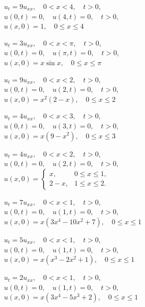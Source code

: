 \begin{exerciselist}
  \item\label{exer:12.1.9} $u_{t}=9u_{xx},\quad0<x<4,\quad t>0$,\\ $u(0,t)=0,\quad u(4,t)=0,\quad t>0$,\\ $u(x,0)=1,\quad0\le x\le4$

  \item\label{exer:12.1.10} $u_{t}=3u_{xx},\quad0<x<\pi,\quad t>0$,\\ $u(0,t)=0,\quad u(\pi,t)=0,\quad t>0$,\\ $u(x,0)=x\sin x,\quad0\le x\le\pi$

  \item\label{exer:12.1.11} \Cex $u_{t}=9u_{xx},\quad0<x<2,\quad t>0$,\\ $u(0,t)=0,\quad u(2,t)=0,\quad t>0$,\\ $u(x,0)=x^{2}(2-x),\quad0\le x\le2$

  \item\label{exer:12.1.12} $u_{t}=4u_{xx},\quad0<x<3,\quad t>0$,\\ $u(0,t)=0,\quad u(3,t)=0,\quad t>0$,\\ $u(x,0)=x(9-x^{2}),\quad0\le x\le3$

  \item\label{exer:12.1.13} $u_{t}=4u_{xx},\quad0<x<2,\quad t>0$,\\ $u(0,t)=0,\quad u(2,t)=0,\quad t>0$,\\ $u(x,0)= \left\{
  \begin{array}{cl}
    x,   & 0\le x\le1, \\
    2-x, & 1\le x\le2.
  \end{array}\right.$

  \item\label{exer:12.1.14} $u_{t}=7u_{xx},\quad0<x<1,\quad t>0$,\\ $u(0,t)=0,\quad u(1,t)=0,\quad t>0$,\\ $u(x,0)=x(3x^{4}-10x^{2}+7),\quad0\le x\le1$

  \item\label{exer:12.1.15} $u_{t}=5u_{xx},\quad0<x<1,\quad t>0$,\\ $u(0,t)=0,\quad u(1,t)=0,\quad t>0$,\\ $u(x,0)=x(x^{3}-2x^{2}+1),\quad0\le x\le1$

  \item\label{exer:12.1.16} $u_{t}=2u_{xx},\quad0<x<1,\quad t>0$,\\ $u(0,t)=0,\quad u(1,t)=0,\quad t>0$,\\ $u(x,0)=x(3x^{4}-5x^{3}+2),\quad0\le x\le1$


\end{exerciselist}
